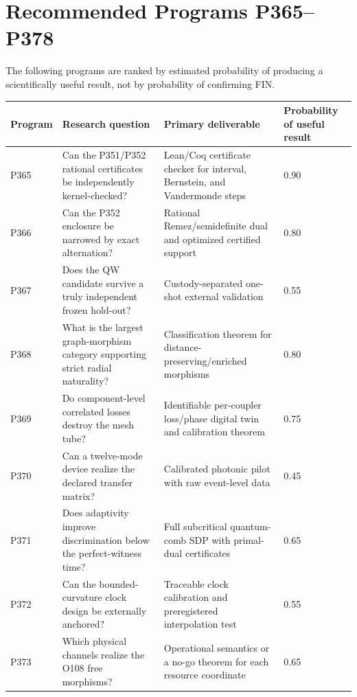 \documentclass[11pt,a4paper,openany]{report}
\begin{document}
\chapter{Recommended Programs P365--P378}

The following programs are ranked by estimated probability of producing a scientifically useful result, not by probability of confirming FIN.

\begin{center}
\begingroup\small
\setlength{\tabcolsep}{2.5pt}
\renewcommand{\arraystretch}{1.16}
\begin{longtable}{@{}p{}p{}p{}p{}@{}}
\toprule
\textbf{Program} & \textbf{Research question} & \textbf{Primary deliverable} & \textbf{Probability of useful result} \\
\midrule
\endhead
P365 & Can the P351/\allowbreak{}P352 rational certificates be independently kernel-checked? & Lean/\allowbreak{}Coq certificate checker for interval, Bernstein, and Vandermonde steps & 0.90 \\
P366 & Can the P352 enclosure be narrowed by exact alternation? & Rational Remez/\allowbreak{}semidefinite dual and optimized certified support & 0.80 \\
P367 & Does the QW candidate survive a truly independent frozen hold-out? & Custody-separated one-shot external validation & 0.55 \\
P368 & What is the largest graph-morphism category supporting strict radial naturality? & Classification theorem for distance-preserving/\allowbreak{}enriched morphisms & 0.80 \\
P369 & Do component-level correlated losses destroy the mesh tube? & Identifiable per-coupler loss/\allowbreak{}phase digital twin and calibration theorem & 0.75 \\
P370 & Can a twelve-mode device realize the declared transfer matrix? & Calibrated photonic pilot with raw event-level data & 0.45 \\
P371 & Does adaptivity improve discrimination below the perfect-witness time? & Full subcritical quantum-comb SDP with primal-dual certificates & 0.65 \\
P372 & Can the bounded-curvature clock design be externally anchored? & Traceable clock calibration and preregistered interpolation test & 0.55 \\
P373 & Which physical channels realize the O108 free morphisms? & Operational semantics or a no-go theorem for each resource coordinate & 0.65 \\

\end{longtable}
\end{center}
\end{document}
